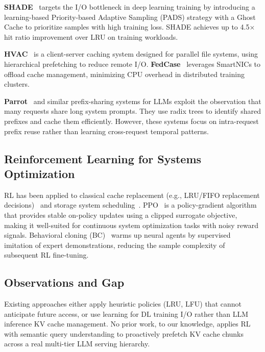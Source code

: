 \documentclass[conference]{IEEEtran}
\begin{document}
\textbf{SHADE}~\cite{shade2022} targets the I/O bottleneck in deep learning training by introducing a learning-based Priority-based Adaptive Sampling (PADS) strategy with a Ghost Cache to prioritize samples with high training loss. SHADE achieves up to 4.5$\times$ hit ratio improvement over LRU on training workloads.

\textbf{HVAC}~\cite{hvac2021} is a client-server caching system designed for parallel file systems, using hierarchical prefetching to reduce remote I/O. \textbf{FedCase}~\cite{fedcache2022} leverages SmartNICs to offload cache management, minimizing CPU overhead in distributed training clusters.

\textbf{Parrot}~\cite{parrot2024} and similar prefix-sharing systems for LLMs exploit the observation that many requests share long system prompts. They use radix trees to identify shared prefixes and cache them efficiently. However, these systems focus on intra-request prefix reuse rather than learning cross-request temporal patterns.

\subsection{Reinforcement Learning for Systems Optimization}

RL has been applied to classical cache replacement (e.g., LRU/FIFO replacement decisions)~\cite{zhong2018open} and storage system scheduling~\cite{mao2016resource}. PPO~\cite{schulman2017proximal} is a policy-gradient algorithm that provides stable on-policy updates using a clipped surrogate objective, making it well-suited for continuous system optimization tasks with noisy reward signals. Behavioral cloning (BC)~\cite{torabi2018behavioral} warms up neural agents by supervised imitation of expert demonstrations, reducing the sample complexity of subsequent RL fine-tuning.

\subsection{Observations and Gap}

Existing approaches either apply heuristic policies (LRU, LFU) that cannot anticipate future access, or use learning for DL training I/O rather than LLM inference KV cache management. No prior work, to our knowledge, applies RL with semantic query understanding to proactively prefetch KV cache chunks across a real multi-tier LLM serving hierarchy.

\end{document}
